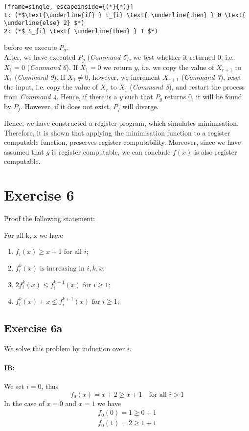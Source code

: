 \documentclass[11pt,a4paper]{article}
\begin{document}
\begin{lstlisting}[frame=single, escapeinside={(*}{*)}] 
1: (*$\text{\underline{if} } t_{i} \text{ \underline{then} } 0 \text{ \underline{else} 2} $*)
2: (*$ S_{i} \text{ \underline{then} } 1 $*)
\end{lstlisting}

before we execute $P_g$. \\
After, we have executed $P_g$  (\emph{Command 5}), we test whether it returned $0$, i.e. $X_1=0$ (\emph{Command 6}).
If $X_1=0$ we return $y$, i.e. we copy the value of $X_{r+1}$ to $X_1$  (\emph{Command 9}).
If $X_1 \neq 0$, however, we increment $X_{r+1}$  (\emph{Command 7}), reset the input, i.e. copy the value of $X_r$ to $X_1$  (\emph{Command 8}), 
and restart the process from \emph{Command 4}.
Hence, if there is a $y$ such that $P_g$ returns $0$, it will be found by $P_f$. However, if it does not exist, $P_f$ will diverge.

Hence, we have constructed a register program, which simulates minimisation. Therefore, it is shown that applying the minimisation function to a register computable function,
preserves register computability. Moreover, since we have assumed that $g$ is register computable, we can conclude $f(x)$ is also register computable.



\section*{Exercise 6}
Proof the following statement:
 \bigbreak
 
For all k, x we have
\begin{enumerate}[label={\alph*)}]
\item $f_i(x) \geq x+1 \text{ for all }i$;
\item $f_i^k(x) \text{ is increasing in } i,k,x$;
\item $2 f_i^k(x) \leq f_i^{k+1}(x) \text{ for } i \geq 1$;
\item $f_i^k(x)+x \leq f_i^{k+1}(x) \text{ for } i \geq 1$;
\end{enumerate}

\bigbreak


\subsection*{Exercise 6a}

We solve this problem by induction over $i$.

\paragraph{IB:} We set $i=0$, thus 
\begin{equation*}
f_0(x) = x + 2 \geq x+1 \quad \text{for all } i > 1
\end{equation*}
In the case of $x=0$ and  $x=1$ we have
\begin{equation*}
\begin{split}
f_0(0) = 1 \geq 0+1 \\
f_0(1) = 2 \geq 1+1
\end{split}
\end{equation*}
\end{document}
